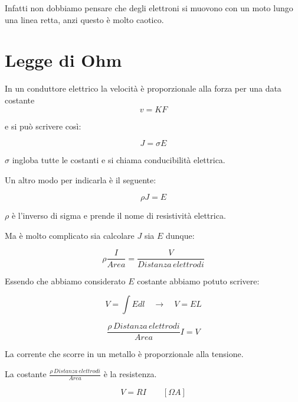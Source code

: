 Infatti non dobbiamo pensare che  degli elettroni si muovono con un moto lungo una linea retta, anzi questo è molto caotico.


\newpage
\section{Legge di Ohm}  

In un conduttore elettrico la velocità è proporzionale alla forza per una data costante
\begin{equation*}
    v = K F
\end{equation*}

e si può scrivere così:

\begin{equation*}
    J = \sigma E
\end{equation*}

$\sigma$ ingloba tutte le costanti e si chiama conducibilità elettrica.

Un altro modo per indicarla è il seguente: 

\begin{equation*}
    \rho J = E
\end{equation*}

$\rho$ è l'inverso di sigma e prende il nome di resistività elettrica.

Ma è molto complicato sia calcolare $J$ sia $E$ dunque:

\begin{equation*}
    \rho \frac{I}{Area} = \frac{V}{Distanza\,elettrodi}
\end{equation*}

Essendo che abbiamo considerato $E$ costante abbiamo potuto scrivere:

\begin{equation*}
    V = \int E dl\quad\rightarrow\quad V = EL
\end{equation*}

\begin{equation*}
     \frac{\rho\,Distanza\,elettrodi}{Area} I = V
\end{equation*}

La corrente che scorre in un metallo è proporzionale alla tensione.

La costante $\frac{\rho\,Distanza\,elettrodi}{Area}$ è la resistenza.

\begin{equation}
     V = R I\qquad[\Omega A]
\end{equation}

